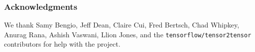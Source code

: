 \subsubsection*{Acknowledgments}

We thank Samy Bengio, Jeff Dean, Claire Cui, Fred Bertsch, Chad Whipkey,
Anurag Rana, Ashish Vaswani, Llion Jones, and the \texttt{tensorflow/tensor2tensor}
contributors for help with the project.

